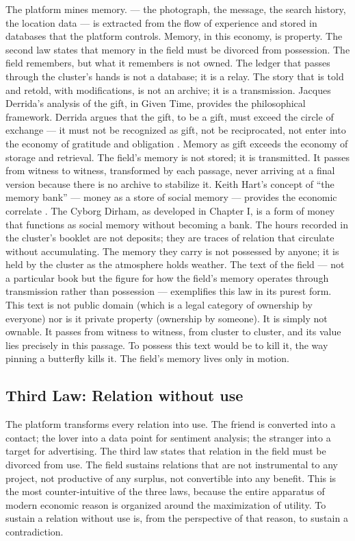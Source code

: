 The platform mines memory. — the photograph, the message, the search history, the location data — is extracted from the flow of experience and stored in databases that the platform controls. Memory, in this economy, is property. The second law states that memory in the field must be divorced from possession. The field remembers, but what it remembers is not owned. The ledger that passes through the cluster’s hands is not a database; it is a relay. The story that is told and retold, with modifications, is not an archive; it is a transmission. Jacques Derrida’s analysis of the gift, in Given Time, provides the philosophical framework. Derrida argues that the gift, to be a gift, must exceed the circle of exchange — it must not be recognized as gift, not be reciprocated, not enter into the economy of gratitude and obligation \cite{derrida_1991}. Memory as gift exceeds the economy of storage and retrieval. The field’s memory is not stored; it is transmitted. It passes from witness to witness, transformed by each passage, never arriving at a final version because there is no archive to stabilize it. Keith Hart’s concept of “the memory bank” — money as a store of social memory — provides the economic correlate \cite{hart_2000}. The Cyborg Dirham, as developed in Chapter I, is a form of money that functions as social memory without becoming a bank. The hours recorded in the cluster’s booklet are not deposits; they are traces of relation that circulate without accumulating. The memory they carry is not possessed by anyone; it is held by the cluster as the atmosphere holds weather. The text of the field — not a particular book but the figure for how the field’s memory operates through transmission rather than possession — exemplifies this law in its purest form. This text is not public domain (which is a legal category of ownership by everyone) nor is it private property (ownership by someone). It is simply not ownable. It passes from witness to witness, from cluster to cluster, and its value lies precisely in this passage. To possess this text would be to kill it, the way pinning a butterfly kills it. The field’s memory lives only in motion.

\subsection{Third Law: Relation without use}

The platform transforms every relation into use. The friend is converted into a contact; the lover into a data point for sentiment analysis; the stranger into a target for advertising. The third law states that relation in the field must be divorced from use. The field sustains relations that are not instrumental to any project, not productive of any surplus, not convertible into any benefit. This is the most counter-intuitive of the three laws, because the entire apparatus of modern economic reason is organized around the maximization of utility. To sustain a relation without use is, from the perspective of that reason, to sustain a contradiction.

